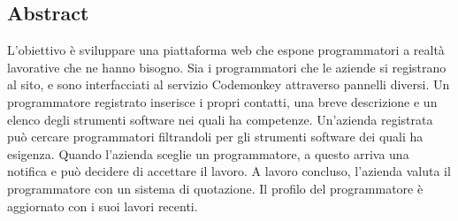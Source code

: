 \subsection {Abstract}

L'obiettivo è sviluppare una piattaforma web che espone programmatori a realtà lavorative che ne hanno bisogno.
Sia i programmatori che le aziende si registrano al sito, e sono interfacciati al servizio Codemonkey attraverso pannelli diversi.
Un programmatore registrato inserisce i propri contatti, una breve descrizione e un elenco degli strumenti software nei quali ha competenze.
Un'azienda registrata può cercare programmatori filtrandoli per gli strumenti software dei quali ha esigenza. Quando l'azienda sceglie un programmatore, a questo arriva una notifica e può decidere di accettare il lavoro.
A lavoro concluso, l'azienda valuta il programmatore con un sistema di quotazione.
Il profilo del programmatore è aggiornato con i suoi lavori recenti.
